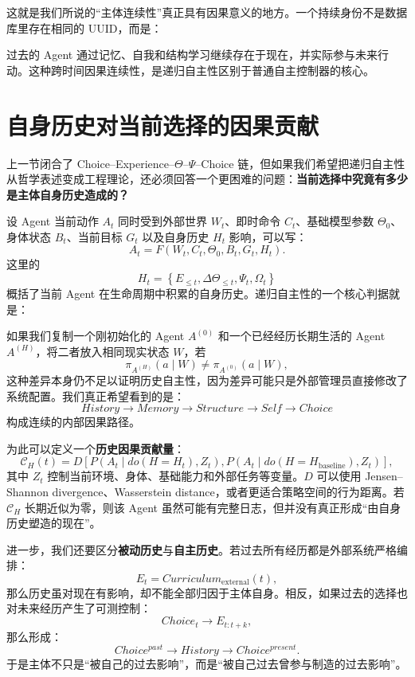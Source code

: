 这就是我们所说的“主体连续性”真正具有因果意义的地方。一个持续身份不是数据库里存在相同的 UUID，而是：
\begin{statementbox}
\centering
{}
\end{statementbox}
过去的 Agent 通过记忆、自我和结构学习继续存在于现在，并实际参与未来行动。这种跨时间因果连续性，是递归自主性区别于普通自主控制器的核心。

\section{自身历史对当前选择的因果贡献}

上一节闭合了 Choice--Experience--$\Theta$--$\Psi$--Choice 链，但如果我们希望把递归自主性从哲学表述变成工程理论，还必须回答一个更困难的问题：\textbf{当前选择中究竟有多少是主体自身历史造成的？}

设 Agent 当前动作 $A_t$ 同时受到外部世界 $W_t$、即时命令 $C_t$、基础模型参数 $\Theta_0$、身体状态 $B_t$、当前目标 $G_t$ 以及自身历史 $H_t$ 影响，可以写：
\[
A_t
=
F(
W_t,C_t,\Theta_0,B_t,G_t,H_t
).
\]
这里的
\[
H_t
=
\left\{
E_{\le t},
\Delta\Theta_{\le t},
\Psi_t,
\Omega_t
\right\}
\]
概括了当前 Agent 在生命周期中积累的自身历史。递归自主性的一个核心判据就是：
\begin{statementbox}
\centering
{}
\end{statementbox}

如果我们复制一个刚初始化的 Agent $A^{(0)}$ 和一个已经经历长期生活的 Agent $A^{(H)}$，将二者放入相同现实状态 $W$，若
\[
\pi_{A^{(H)}}(a\mid W)
\neq
\pi_{A^{(0)}}(a\mid W),
\]
这种差异本身仍不足以证明历史自主性，因为差异可能只是外部管理员直接修改了系统配置。我们真正希望看到的是：
\[
History
\rightarrow
Memory
\rightarrow
Structure
\rightarrow
Self
\rightarrow
Choice
\]
构成连续的内部因果路径。

为此可以定义一个\textbf{历史因果贡献量}：
\[
\mathcal C_H(t)
=
D
\left[
P(A_t\mid do(H=H_t),Z_t),
P(A_t\mid do(H=H_{\mathrm{baseline}}),Z_t)
\right],
\]
其中 $Z_t$ 控制当前环境、身体、基础能力和外部任务等变量。$D$ 可以使用 Jensen--Shannon divergence、Wasserstein distance，或者更适合策略空间的行为距离。若 $\mathcal C_H$ 长期近似为零，则该 Agent 虽然可能有完整日志，但并没有真正形成“由自身历史塑造的现在”。

进一步，我们还要区分\textbf{被动历史}与\textbf{自主历史}。若过去所有经历都是外部系统严格编排：
\[
E_t
=
Curriculum_{\mathrm{external}}(t),
\]
那么历史虽对现在有影响，却不能全部归因于主体自身。相反，如果过去的选择也对未来经历产生了可测控制：
\[
Choice_t
\rightarrow
E_{t:t+k},
\]
那么形成：
\[
Choice^{past}
\rightarrow
History
\rightarrow
Choice^{present}.
\]
于是主体不只是“被自己的过去影响”，而是“被自己过去曾参与制造的过去影响”。

